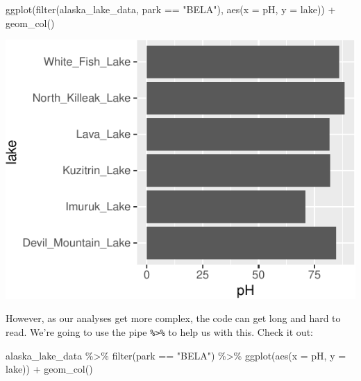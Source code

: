 \documentclass[
]{krantz}
\newenvironment{Shaded}{\begin{snugshade}}{\end{snugshade}}
\newcommand{\AttributeTok}[1]{\textcolor[rgb]{0.77,0.63,0.00}{#1}}
\newcommand{\FunctionTok}[1]{\textcolor[rgb]{0.00,0.00,0.00}{#1}}
\newcommand{\NormalTok}[1]{#1}
\newcommand{\SpecialCharTok}[1]{\textcolor[rgb]{0.00,0.00,0.00}{#1}}
\newcommand{\StringTok}[1]{\textcolor[rgb]{0.31,0.60,0.02}{#1}}
\begin{document}
\begin{Shaded}
\begin{Highlighting}[]
\FunctionTok{ggplot}\NormalTok{(}\FunctionTok{filter}\NormalTok{(alaska\_lake\_data, park }\SpecialCharTok{==} \StringTok{"BELA"}\NormalTok{), }\FunctionTok{aes}\NormalTok{(}\AttributeTok{x =}\NormalTok{ pH, }\AttributeTok{y =}\NormalTok{ lake)) }\SpecialCharTok{+} \FunctionTok{geom\_col}\NormalTok{()}
\end{Highlighting}
\end{Shaded}

\begin{center}\includegraphics{index_files/figure-latex/unnamed-chunk-69-1} \end{center}

However, as our analyses get more complex, the code can get long and hard to read. We're going to use the pipe \texttt{\%\textgreater{}\%} to help us with this. Check it out:

\begin{Shaded}
\begin{Highlighting}[]
\NormalTok{alaska\_lake\_data }\SpecialCharTok{\%\textgreater{}\%}
  \FunctionTok{filter}\NormalTok{(park }\SpecialCharTok{==} \StringTok{"BELA"}\NormalTok{) }\SpecialCharTok{\%\textgreater{}\%}
  \FunctionTok{ggplot}\NormalTok{(}\FunctionTok{aes}\NormalTok{(}\AttributeTok{x =}\NormalTok{ pH, }\AttributeTok{y =}\NormalTok{ lake)) }\SpecialCharTok{+} \FunctionTok{geom\_col}\NormalTok{()}
\end{Highlighting}
\end{Shaded}
\end{document}
